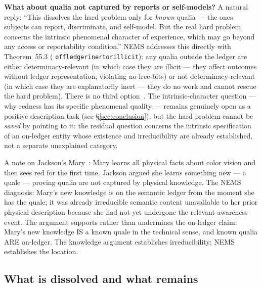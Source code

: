 \documentclass[11pt]{article}
\theoremstyle{remark}
\newcommand{\lean}[1]{%
  \penalty-100
  \begingroup\def\_{\textunderscore\allowbreak}\texttt{#1}\endgroup}
\begin{document}
\medskip
\noindent\textbf{What about qualia not captured by reports or self-models?}
A natural reply: ``This dissolves the hard problem only for \emph{known} qualia
--- the ones subjects can report, discriminate, and self-model. But the real hard
problem concerns the intrinsic phenomenal character of experience, which may go
beyond any access or reportability condition.'' NEMS addresses this directly with
Theorem~55.3 (\lean{off\_ledger\_inert\_or\_illicit}): any qualia outside the ledger
are either determinacy-relevant (in which case they are illicit --- they affect
outcomes without ledger representation, violating no-free-bits) or not
determinacy-relevant (in which case they are explanatorily inert --- they do no
work and cannot rescue the hard problem). There is no third option~\cite{SpivackNEMS55}.
The intrinsic-character question --- why redness has its specific phenomenal quality
--- remains genuinely open as a positive description task (see \S\ref{sec:conclusion}), but the
hard problem cannot be \emph{saved} by pointing to it: the residual question concerns
the intrinsic specification of an on-ledger entity whose existence and irreducibility
are already established, not a separate unexplained category.

\medskip
\noindent A note on Jackson's Mary~\cite{Jackson1982}: Mary learns all physical facts
about color vision and then sees red for the first time. Jackson argued she learns
something new --- a quale --- proving qualia are not captured by physical knowledge.
The NEMS diagnosis: Mary's new knowledge is on the semantic ledger from the moment
she has the quale; it was already irreducible semantic content unavailable to her
prior physical description because she had not yet undergone the relevant awareness
event. The argument supports rather than undermines the on-ledger claim: Mary's
new knowledge IS a known quale in the technical sense, and known qualia ARE on-ledger.
The knowledge argument establishes irreducibility; NEMS establishes the location.


\subsection{What is dissolved and what remains}
\end{document}
